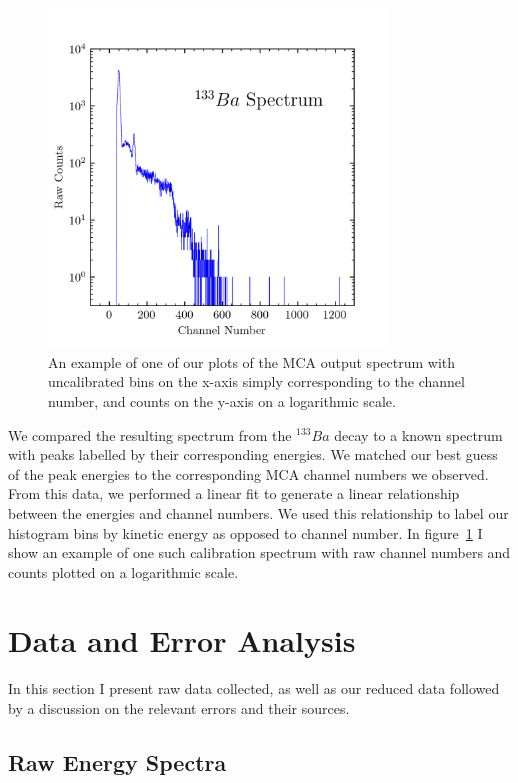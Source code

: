 \documentclass[aps,twocolumn,secnumarabic,balancelastpage,amsmath,amssymb,nofootinbib, floatfix]{revtex4-2}
\begin{document}
	\begin{figure}[h]
		\centering
		\includegraphics[width=9cm]{sample_calibration2.png}
		\caption{An example of one of our plots of the MCA output spectrum with uncalibrated bins on the x-axis simply corresponding to the channel number, and counts on the y-axis on a logarithmic scale.}
		\label{fig:calib}
	\end{figure}
	We compared the resulting spectrum from the $^{133}Ba$ decay to a known spectrum with peaks labelled by their corresponding energies. We matched our best guess of the peak energies to the corresponding MCA channel numbers we observed. From this data, we performed a linear fit to generate a linear relationship between the energies and channel numbers. We used this relationship to label our histogram bins by kinetic energy as opposed to channel number. In figure~\ref{fig:calib} I show an example of one such calibration spectrum with raw channel numbers and counts plotted on a logarithmic scale. 

	\section{Data and Error Analysis}
	
	
	In this section I present raw data collected, as well as our reduced data followed by a discussion on the relevant errors and their sources. 
	
	\subsection{Raw Energy Spectra}
	
\end{document}

